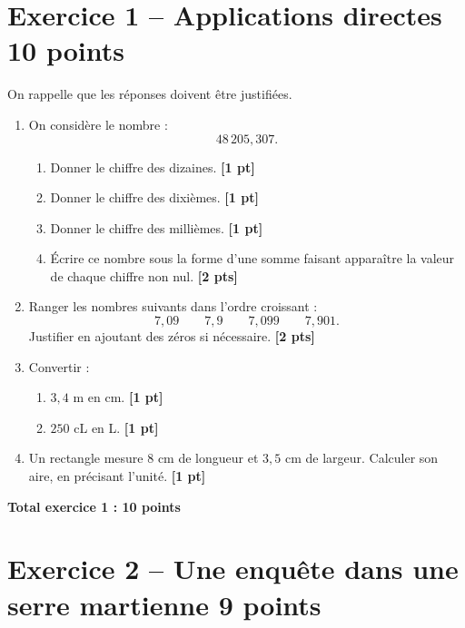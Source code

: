 \documentclass[11pt,a4paper]{article}
\newcommand{\pts}[1]{\hfill \textbf{[#1 pt]}}
\newcommand{\ptss}[1]{\hfill \textbf{[#1 pts]}}
\begin{document}
\newpage

\section*{Exercice 1 -- Applications directes \hfill 10 points}

On rappelle que les réponses doivent être justifiées.

\begin{enumerate}[label=\textbf{\arabic*)}]

\item On considère le nombre :
\[
48\,205,307.
\]
\begin{enumerate}[label=\alph*)]
    \item Donner le chiffre des dizaines. \pts{1}
    \item Donner le chiffre des dixièmes. \pts{1}
    \item Donner le chiffre des millièmes. \pts{1}
    \item Écrire ce nombre sous la forme d'une somme faisant apparaître la valeur de chaque chiffre non nul. \ptss{2}
\end{enumerate}

\item Ranger les nombres suivants dans l'ordre croissant :
\[
7,09 \qquad 7,9 \qquad 7,099 \qquad 7,901.
\]
Justifier en ajoutant des zéros si nécessaire. \ptss{2}

\item Convertir :
\begin{enumerate}[label=\alph*)]
    \item $3,4$ m en cm. \pts{1}
    \item $250$ cL en L. \pts{1}
\end{enumerate}

\item Un rectangle mesure $8$ cm de longueur et $3,5$ cm de largeur.
Calculer son aire, en précisant l'unité. \pts{1}

\end{enumerate}

\hfill \textbf{Total exercice 1 : 10 points}

\section*{Exercice 2 -- Une enquête dans une serre martienne \hfill 9 points}
\end{document}
